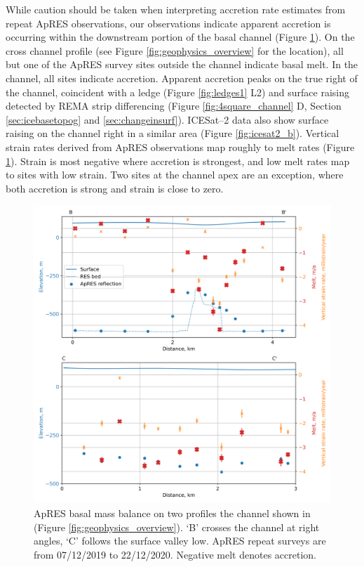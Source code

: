 While caution should be taken when interpreting accretion rate estimates from repeat ApRES observations, our observations indicate apparent accretion is occurring within the downstream portion of the basal channel (Figure \ref{fig:APRES_melt}). 
On the cross channel profile (see Figure \ref{fig:geophysics_overview} for the location), all but one of the ApRES survey sites outside the channel indicate basal melt. In the channel, all sites indicate accretion. Apparent accretion peaks on the true right of the channel, coincident with a ledge (Figure \ref{fig:ledges1} L2) and surface raising detected by REMA strip differencing (Figure \ref{fig:4square_channel} D, Section \ref{sec:icebasetopog} and \ref{sec:changeinsurf}). ICESat--2 data also show surface raising on the channel right in a similar area (Figure \ref{fig:icesat2_b}). 
Vertical strain rates derived from ApRES observations map roughly to melt rates (Figure \ref{fig:APRES_melt}). Strain is most negative where accretion is strongest, and low melt rates map to sites with low strain. Two sites at the channel apex are an exception, where both accretion is strong and strain is close to zero.

\begin{figure}[!ht]
\centering
\includegraphics[width=1\textwidth]{chapters/2/APRES_melt.png}
\caption[ApRES results]{ApRES basal mass balance on two profiles the channel shown in (Figure \ref{fig:geophysics_overview}). `B' crosses the channel at right angles, `C' follows the surface valley low.  ApRES repeat surveys are from 07/12/2019 to 22/12/2020. Negative melt denotes accretion.   }
\label{fig:APRES_melt}
\end{figure}  



